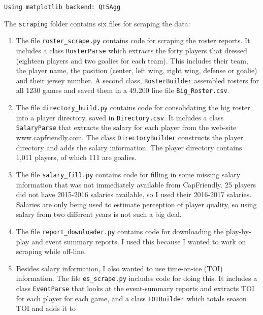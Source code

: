 \documentclass[11pt]{article}
\begin{document}
    \begin{Verbatim}[commandchars=\\\{\}]
Using matplotlib backend: Qt5Agg

    \end{Verbatim}

    The \texttt{scraping} folder contains six files for scraping the data:

\begin{enumerate}
\def\labelenumi{\arabic{enumi}.}
\item
  The file \texttt{roster\_scrape.py} contains code for scraping the
  roster reports. It includes a class \texttt{RosterParse} which
  extracts the forty players that dressed (eighteen players and two
  goalies for each team). This includes their team, the player name, the
  position (center, left wing, right wing, defense or goalie) and their
  jersey number. A second class, \texttt{RosterBuilder} assembled
  rosters for all 1230 games and saved them in a 49,200 line file
  \texttt{Big\_Roster.csv}.
\item
  The file \texttt{directory\_build.py} contains code for consolidating
  the big roster into a player directory, saved in
  \texttt{Directory.csv}. It includes a class \texttt{SalaryParse} that
  extracts the salary for each player from the web-site
  www.capfriendly.com. The class \texttt{DirectoryBuilder} constructs
  the player directory and adds the salary information. The player
  directory contains 1,011 players, of which 111 are goalies.
\item
  The file \texttt{salary\_fill.py} contains code for filling in some
  missing salary information that was not immediately available from
  CapFriendly. 25 players did not have 2015-2016 salaries available, so
  I used their 2016-2017 salaries. Salaries are only being used to
  estimate perception of player quality, so using salary from two
  different years is not such a big deal.
\item
  The file \texttt{report\_downloader.py} contains code for downloading
  the play-by-play and event summary reports. I used this because I
  wanted to work on scraping while off-line.
\item
  Besides salary information, I also wanted to use time-on-ice (TOI)
  information. The file \texttt{es\_scrape.py} includes code for doing
  this. It includes a class \texttt{EventParse} that looks at the
  event-summary reports and extracts TOI for each player for each game,
  and a class \texttt{TOIBuilder} which totals season TOI and adds it to

\end{enumerate}
\end{document}

